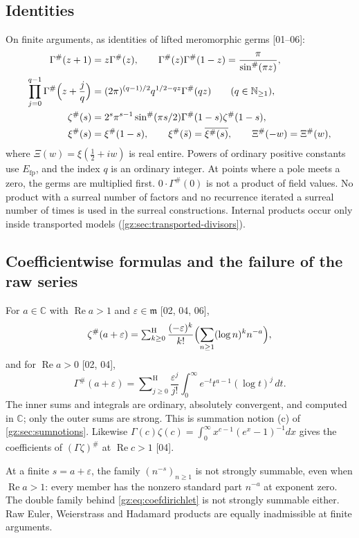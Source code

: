 \documentclass[11pt,a4paper]{article}
\numberwithin{equation}{section}
\theoremstyle{definition}
\theoremstyle{remark}
\newcommand{\C}{\mathbb C}
\newcommand{\N}{\mathbb N}
\newcommand{\mm}{\mathfrak m}
\newcommand{\eps}{\varepsilon}
\renewcommand{\Re}{\operatorname{Re}}
\newcommand{\Efp}{E_{\mathrm{fp}}}
\newcommand{\Sh}{\mathop{\textstyle\sum}\nolimits^{\mathrm H}}
\newcommand{\Gp}{\Gamma^{\#}}
\newcommand{\zp}{\zeta^{\#}}
\newcommand{\xip}{\xi^{\#}}
\newcommand{\src}[1]{\textup{[#1]}}
\begin{document}
\subsection{Identities}\label{gz:sec:finite-identities}
On finite arguments, as identities of lifted meromorphic germs
\src{01--06}:
\begin{align}
\Gp(z+1)&=z\Gp(z),\qquad \Gp(z)\Gp(1-z)=\frac\pi{\sin^\#(\pi z)},\label{gz:eq:finiteref}\\
\prod_{j=0}^{q-1}\Gp\Bigl(z+\frac jq\Bigr)&=(2\pi)^{(q-1)/2}q^{1/2-qz}\Gp(qz)\qquad(q\in\N_{\ge1}),\label{gz:eq:finitegauss}\\
\zp(s)&=2^s\pi^{s-1}\sin^\#(\pi s/2)\Gp(1-s)\zp(1-s),\label{gz:eq:finiteFE}\\
\xip(s)&=\xip(1-s),\qquad\xip(\bar s)=\overline{\xip(s)},\qquad\Xi^\#(-w)=\Xi^\#(w),\label{gz:eq:xisym}
\end{align}
where $\Xi(w)=\xi(\tfrac12+iw)$ is real entire. Powers of ordinary positive
constants use $\Efp$, and the index $q$ is an ordinary integer. At points
where a pole meets a zero, the germs are multiplied first. $0\cdot\Gp(0)$
is not a product of field values. No product with a surreal number of
factors and no recurrence iterated a surreal number of times is used in the
surreal constructions. Internal products occur only inside transported
models (\cref{gz:sec:transported-divisors}).

\subsection{Coefficientwise formulas and the failure of the raw series}\label{gz:sec:coefficientwise}
For $a\in\C$ with $\Re a>1$ and $\eps\in\mm$ \src{02, 04, 06},
\begin{equation}\label{gz:eq:coefdirichlet}
\zp(a+\eps)=\Sh_{k\ge0}\frac{(-\eps)^k}{k!}\Bigl(\sum_{n\ge1}(\log n)^kn^{-a}\Bigr),
\end{equation}
and for $\Re a>0$ \src{02, 04},
\begin{equation}\label{gz:eq:coefmellin}
\Gp(a+\eps)=\Sh_{j\ge0}\frac{\eps^j}{j!}\int_0^\infty e^{-t}t^{a-1}(\log t)^j\,dt .
\end{equation}
The inner sums and integrals are ordinary, absolutely convergent, and
computed in $\C$; only the outer sums are strong. This is summation notion
(c) of \cref{gz:sec:sumnotions}. Likewise $\Gamma(c)\zeta(c)=\int_0^\infty x^{c-1}(e^x-1)^{-1}dx$
gives the coefficients of $(\Gamma\zeta)^\#$ at $\Re c>1$ \src{04}.

\begin{warning}[The raw finite Dirichlet family \src{01, 02, 04, 05, 06}]\label{gz:warn:finite-raw}
At a finite $s=a+\eps$, the family $(n^{-s})_{n\ge1}$ is not strongly
summable, even when $\Re a>1$: every member has the nonzero standard part
$n^{-a}$ at exponent zero. The double family behind \eqref{gz:eq:coefdirichlet}
is not strongly summable either. Raw Euler, Weierstrass and Hadamard
products are equally inadmissible at finite arguments.
\end{warning}
\end{document}
